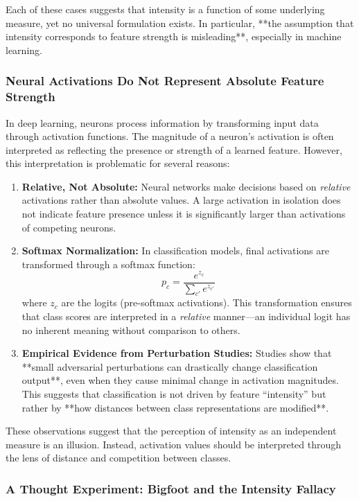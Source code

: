 Each of these cases suggests that intensity is a function of some underlying measure, yet no universal formulation exists. In particular, **the assumption that intensity corresponds to feature strength is misleading**, especially in machine learning.

\subsubsection{Neural Activations Do Not Represent Absolute Feature Strength}

In deep learning, neurons process information by transforming input data through activation functions. The magnitude of a neuron’s activation is often interpreted as reflecting the presence or strength of a learned feature. However, this interpretation is problematic for several reasons:

\begin{enumerate}
    \item \textbf{Relative, Not Absolute:} Neural networks make decisions based on \textit{relative} activations rather than absolute values. A large activation in isolation does not indicate feature presence unless it is significantly larger than activations of competing neurons.
    \item \textbf{Softmax Normalization:} In classification models, final activations are transformed through a softmax function:
    \[
    p_c = \frac{e^{z_c}}{\sum_{c'} e^{z_{c'}}}
    \]
    where \( z_c \) are the logits (pre-softmax activations). This transformation ensures that class scores are interpreted in a \textit{relative} manner---an individual logit has no inherent meaning without comparison to others.
    \item \textbf{Empirical Evidence from Perturbation Studies:} Studies show that **small adversarial perturbations can drastically change classification output**, even when they cause minimal change in activation magnitudes. This suggests that classification is not driven by feature “intensity” but rather by **how distances between class representations are modified**.
\end{enumerate}

These observations suggest that the perception of intensity as an independent measure is an illusion. Instead, activation values should be interpreted through the lens of distance and competition between classes.

\subsubsection{A Thought Experiment: Bigfoot and the Intensity Fallacy}

